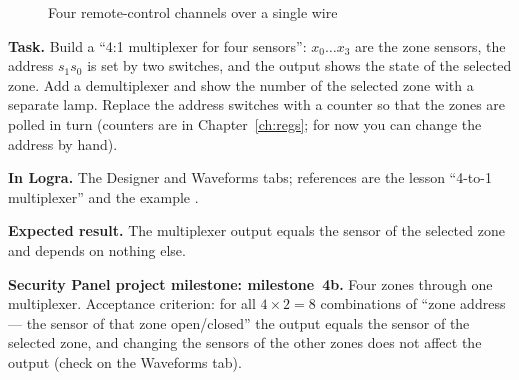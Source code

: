 \begin{figure}[H]
\centering
{}
\caption{Four remote-control channels over a single wire}
\end{figure}

\begin{diybox}
\textbf{Task.}  Build a ``4:1 multiplexer for four sensors'':
$x_0\ldots x_3$ are the zone sensors, the address $s_1s_0$ is set by two
switches, and the output shows the state of the selected zone.  Add a
demultiplexer and show the number of the selected zone with a separate lamp.
 Replace the address switches with a counter so that the zones are
polled in turn (counters are in Chapter~\ref{ch:regs}; for now you can change
the address by hand).

\textbf{In Logra.} The Designer and Waveforms tabs; references are the lesson
``4-to-1 multiplexer'' and the example .

\textbf{Expected result.} The multiplexer output equals the sensor of the
selected zone and depends on nothing else.

\textbf{Security Panel project milestone: milestone~4b.} Four zones through one
multiplexer. Acceptance criterion: for all $4\times 2=8$ combinations of ``zone
address --- the sensor of that zone open/closed'' the output equals the sensor
of the selected zone, and changing the sensors of the other zones does not
affect the output (check on the Waveforms tab).
\end{diybox}

